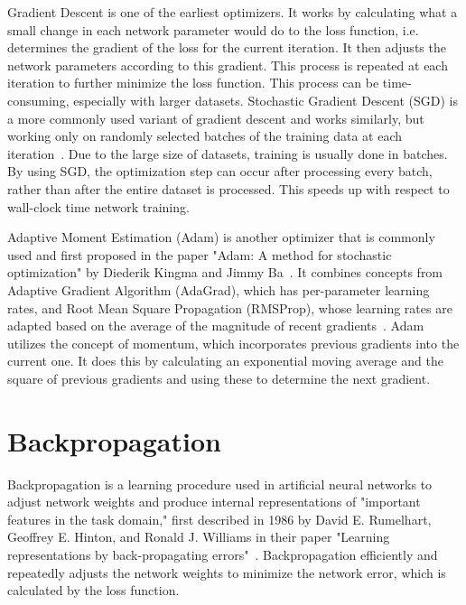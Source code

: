 Gradient Descent is one of the earliest optimizers.
It works by calculating what a small change in each network parameter would do to the loss function, i.e. determines the gradient of the loss for the current iteration.
It then adjusts the network parameters according to this gradient.
This process is repeated at each iteration to further minimize the loss function.
This process can be time-consuming, especially with larger datasets.
Stochastic Gradient Descent (SGD) is a more commonly used variant of gradient descent and works similarly, but working only on randomly selected batches of the training data at each iteration~\cite{optimizer-intro}.
Due to the large size of datasets, training is usually done in batches.
By using SGD, the optimization step can occur after processing every batch, rather than after the entire dataset is processed.
This speeds up with respect to wall-clock time network training.

Adaptive Moment Estimation (Adam) is another optimizer that is commonly used and first proposed in the paper "Adam: A method for stochastic optimization" by Diederik Kingma and Jimmy Ba~\cite{adam}.
It combines concepts from Adaptive Gradient Algorithm (AdaGrad), which has per-parameter learning rates, and Root Mean Square Propagation (RMSProp), whose learning rates are adapted based on the average of the magnitude of recent gradients~\cite{adam}.
Adam utilizes the concept of momentum, which incorporates previous gradients into the current one.
It does this by calculating an exponential moving average and the square of previous gradients and using these to determine the next gradient.

\section{Backpropagation}\label{section:background-backpropagation}
Backpropagation is a learning procedure used in artificial neural networks to adjust network weights and produce internal representations of "important features in the task domain," first described in 1986 by David E. Rumelhart, Geoffrey E. Hinton, and Ronald J. Williams in their paper "Learning representations by back-propagating errors"~\cite{backprop}.
Backpropagation efficiently and repeatedly adjusts the network weights to minimize the network error, which is calculated by the loss function.

